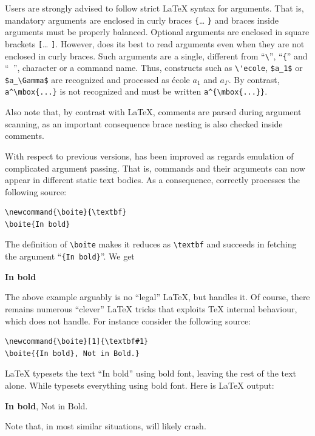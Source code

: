 Users are strongly advised to follow strict \LaTeX{} syntax for
arguments. That is, mandatory arguments are enclosed in curly braces
\verb+{+\ldots{} \verb+}+ and braces inside arguments must be properly
balanced.
Optional arguments are enclosed in square brackets \verb+[+\ldots{}
\verb+]+.
However, \hevea{} does its best to read arguments even when they are
not enclosed in curly braces.
Such arguments are a single, different from ``\verb+\+'', ``\verb+{+''
and ``\verb+ +'', character or
a command name.
Thus, constructs such as \verb+\'ecole+,
\verb+$a_1$+ or \verb+$a_\Gamma$+ are
recognized and processed as \'ecole $a_1$ and $a_\Gamma$.
By contrast, \verb+a^\mbox{...}+ is not recognized
and must be written  \verb+a^{\mbox{...}}+.

Also note that, by contrast with \LaTeX{}, comments are parsed during
argument scanning, as an important consequence brace nesting is also
checked inside comments.

With respect to previous versions,
\hevea{} has been improved as regards emulation of complicated
argument passing. That is,
commands and their arguments can now appear in
different static text bodies. As a consequence,
\hevea{} correctly processes the following source:
\begin{verbatim}
\newcommand{\boite}{\textbf}
\boite{In bold}
\end{verbatim}
The definition of \verb+\boite+ makes it reduces as
\verb+\textbf+ and \hevea{} succeeds in fetching the argument
``\verb+{In bold}+''. We get
\begin{htmlout}
\newcommand{\boite}{\textbf}
\boite{In bold}
\end{htmlout}

The above example arguably is no ``legal'' \LaTeX{},
but \hevea{} handles it.
Of course, there remains
numerous ``clever'' \LaTeX{} tricks that exploits \TeX{} internal
behaviour, which \hevea{} does not handle.
For instance consider the following source:
\begin{verbatim}
\newcommand{\boite}[1]{\textbf#1}
\boite{{In bold}, Not in Bold.}
\end{verbatim}
\LaTeX{} typesets the text ``In bold'' using bold font, leaving
the rest of the text alone. While \hevea{} typesets everything using
bold font. Here is \ifhevea\hevea\else\LaTeX\fi{} output:
\begin{htmlout}
\newcommand{\boite}[1]{\textbf#1}
\boite{{In bold}, Not in Bold.}
\end{htmlout}
Note that, in most similar situations, \hevea{} will likely crash.


